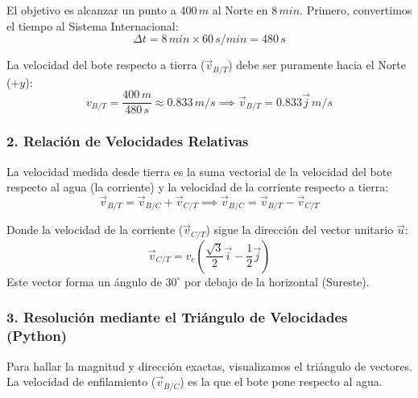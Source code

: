 \documentclass[12pt, a4paper]{article}
\begin{document}
El objetivo es alcanzar un punto a $400 \, \si{m}$ al Norte en $8 \, \si{min}$. Primero, convertimos el tiempo al Sistema Internacional:
\begin{equation}
    \Delta t = 8 \, \si{min} \times 60 \, \si{s/min} = 480 \, \si{s}
\end{equation}

La velocidad del bote respecto a tierra ($\vec{v}_{B/T}$) debe ser puramente hacia el Norte ($+y$):
\begin{equation}
    v_{B/T} = \frac{400 \, \si{m}}{480 \, \si{s}} \approx 0.833 \, \si{m/s} \implies \vec{v}_{B/T} = 0.833 \vec{j} \, \si{m/s}
\end{equation}

\subsubsection*{2. Relación de Velocidades Relativas}

La velocidad medida desde tierra es la suma vectorial de la velocidad del bote respecto al agua (la corriente) y la velocidad de la corriente respecto a tierra:
\begin{equation}
    \vec{v}_{B/T} = \vec{v}_{B/C} + \vec{v}_{C/T} \implies \vec{v}_{B/C} = \vec{v}_{B/T} - \vec{v}_{C/T}
\end{equation}

Donde la velocidad de la corriente ($\vec{v}_{C/T}$) sigue la dirección del vector unitario $\vec{u}$:
\begin{equation}
    \vec{v}_{C/T} = v_c \left( \frac{\sqrt{3}}{2} \vec{i} - \frac{1}{2} \vec{j} \right)
\end{equation}
Este vector forma un ángulo de $30^\circ$ por debajo de la horizontal (Sureste).

\subsubsection*{3. Resolución mediante el Triángulo de Velocidades (Python)}

Para hallar la magnitud y dirección exactas, visualizamos el triángulo de vectores. La velocidad de enfilamiento ($\vec{v}_{B/C}$) es la que el bote pone respecto al agua.
\end{document}
